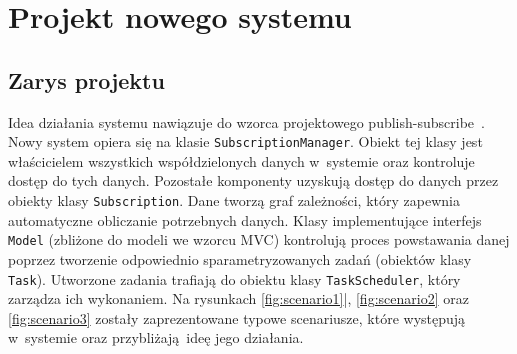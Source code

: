 \chapter{Projekt nowego systemu}

\section{Zarys projektu}
Idea działania systemu nawiązuje do wzorca projektowego publish-subscribe~\cite{pubsub}. Nowy system opiera się na klasie \lstinline$SubscriptionManager$. Obiekt tej klasy jest właścicielem wszystkich współdzielonych danych w~systemie oraz kontroluje dostęp do tych danych. Pozostałe komponenty uzyskują dostęp do danych przez obiekty klasy \lstinline$Subscription$. Dane tworzą graf zależności, który zapewnia automatyczne obliczanie potrzebnych danych. Klasy implementujące interfejs \lstinline$Model$ (zbliżone do modeli we wzorcu MVC) kontrolują proces powstawania danej poprzez tworzenie odpowiednio sparametryzowanych zadań (obiektów klasy \lstinline$Task$). Utworzone zadania trafiają do obiektu klasy \lstinline$TaskScheduler$, który zarządza ich wykonaniem. Na rysunkach \ref{fig:scenario1}|, \ref{fig:scenario2} oraz \ref{fig:scenario3} zostały zaprezentowane typowe scenariusze, które występują w~systemie oraz przybliżają ideę jego działania.


